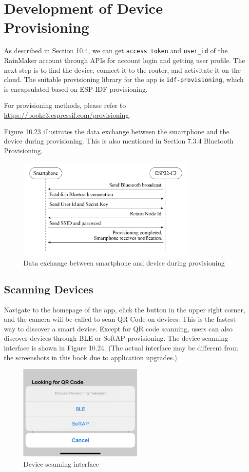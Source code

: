 \documentclass[a4paper,12pt,openany]{book}
\begin{document}
\section{Development of Device Provisioning}
As described in Section 10.4, we can get \verb|access token| and \verb|user_id| of the RainMaker account through APIs for account login and getting user profile. The next step is to find the device, connect it to the router, and activitate it on the cloud. The suitable provisioning library for the app is \verb|idf-provisioning|, which is encapsulated based on ESP-IDF provisioning.

For provisioning methods, please refer to \url{https://bookc3.espressif.com/provisioning}.

Figure 10.23 illustrates the data exchange between the smartphone and the device during provisioning. This is also mentioned in Section 7.3.4 Bluetooth Provisioning.

\begin{figure}[ht]
    \centering
    \includegraphics[width=0.8\textwidth]{D10Z/10-23}
    \caption{Data exchange between smartphone and device during provisioning}
\end{figure}

\subsection{Scanning Devices}
Navigate to the homepage of the app, click the button in the upper right corner, and the camera will be called to scan QR Code on devices. This is the fastest way to discover a smart device. Except for QR code scanning, users can also discover devices through BLE or SoftAP provisioning. The device scanning interface is shown in Figure 10.24. (The actual interface may be different from the screenshots in this book due to application upgrades.)

\begin{figure}[ht]
    \centering
    \includegraphics[width=0.55\textwidth]{D10Z/10-24}
    \caption{Device scanning interface}
\end{figure}
\end{document}
